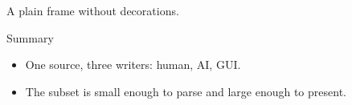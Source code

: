 \documentclass[aspectratio=169]{beamer}
\begin{document}
\begin{frame}[plain]
  \begin{center}
    A plain frame without decorations.
  \end{center}
\end{frame}

\begin{frame}{Summary}
  \begin{itemize}
    \item One source, three writers: human, AI, GUI.
    \item The subset is small enough to parse and large enough to present.
  \end{itemize}
\end{frame}
\end{document}
